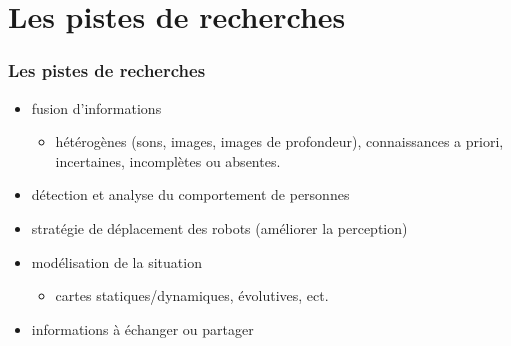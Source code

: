 \documentclass[usepdftitle=false, xcolor=dvipsnames, 12, c]{beamer} %
\begin{document}
\section{Les pistes de recherches}
\begin{frame}[label=pistesRecherches]
\frametitle{Les pistes de recherches}
    \begin{itemize}
        \item fusion d'informations 
        \begin{itemize}
            \item[] hétérogènes (sons, images, images de profondeur), connaissances a priori, incertaines, incomplètes ou absentes.
        \end{itemize}
        \item détection et analyse du comportement de personnes 
        \item stratégie de déplacement des robots (améliorer la perception)
        \item modélisation de la situation
        \begin{itemize}
            \item[] cartes statiques/dynamiques, évolutives, ect.
        \end{itemize}
        \item informations à échanger ou partager
    \end{itemize}
\end{frame}
\end{document}

